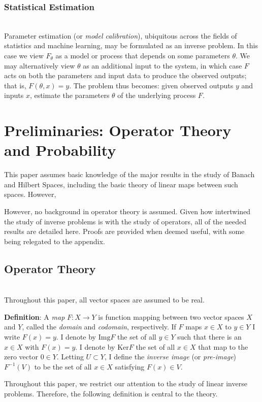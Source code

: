 \documentclass[12pt]{article}
\newcommand{\Img}{\mathrm{Img}}
\newcommand{\Ker}{\mathrm{Ker}}
\begin{document}
 \subsubsection{Statistical Estimation} \hfill \\
 Parameter estimation (or \textit{model calibration}), ubiquitous across the fields of statistics and machine learning, may be formulated as an inverse problem. In this case we view $F_\theta$ as a model or process that depends on some parameters $\theta$. We may alternatively view $\theta$ as an additional input to the system, in which case $F$ acts on both the parameters and input data to produce the observed outputs; that is, $F(\theta, x) = y$. The problem thus becomes: given observed outputs $y$ and inputs $x$, estimate the parameters $\theta$ of the underlying process $F$. 
 
 \section{Preliminaries: Operator Theory and Probability}
 This paper assumes basic knowledge of the major results in the study of Banach and Hilbert Spaces, including the basic theory of linear maps between such spaces. However, 
 
 
 However, no background in operator theory is assumed. Given how intertwined the study of inverse problems is with the study of operators, all of the needed results are detailed here. Proofs are provided when deemed useful, with some being relegated to the appendix. 
 
 \subsection{Operator Theory} \hfill \\
 Throughout this paper, all vector spaces are assumed to be real. 
 
 \textbf{Definition}: A \textit{map} $F: X \to Y$ is function mapping between two vector spaces $X$ and $Y$, called the \textit{domain} and \textit{codomain}, respectively. If $F$ maps $x \in X$ to $y \in Y$ I write $F(x) = y$. I denote by $\Img F$ the set of all $y \in Y$ such that there is an $x \in X$ with $F(x) = y$. I denote by $\Ker F$ the set of all $x \in X$ that map to the zero vector $0 \in Y$. Letting $U \subset Y$, I define the \textit{inverse image} (or \textit{pre-image}) $F^{-1}(V)$ to be the set of all $x \in X$ satisfying $F(x) \in V$. 
 
 Throughout this paper, we restrict our attention to the study of linear inverse problems. Therefore, the following definition is central to the theory. 
 
\end{document}

